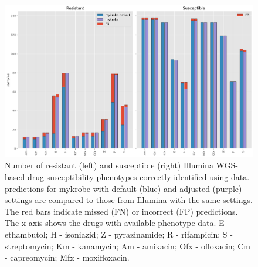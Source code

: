 \begin{figure}
\begin{center}
\includegraphics[width=0.90\columnwidth]{Appendix2/Figs/mykrobe_settings_illumina_concordance.png}
\caption{{Number of resistant (left) and susceptible (right) Illumina WGS-based drug susceptibility phenotypes correctly identified using \ont{} data. \ont{} predictions for mykrobe with default (blue) and adjusted (purple) settings are compared to those from Illumina with the same settings. The red bars indicate missed (FN) or incorrect (FP) predictions. The x-axis shows the drugs with available phenotype data. E - ethambutol; H - isoniazid; Z - pyrazinamide; R - rifampicin; S - streptomycin; Km - kanamycin; Am - amikacin; Ofx - ofloxacin; Cm - capreomycin; Mfx - moxifloxacin.
{\label{fig:mykrobe-settings-geno}}
}}
\end{center}
\end{figure}


